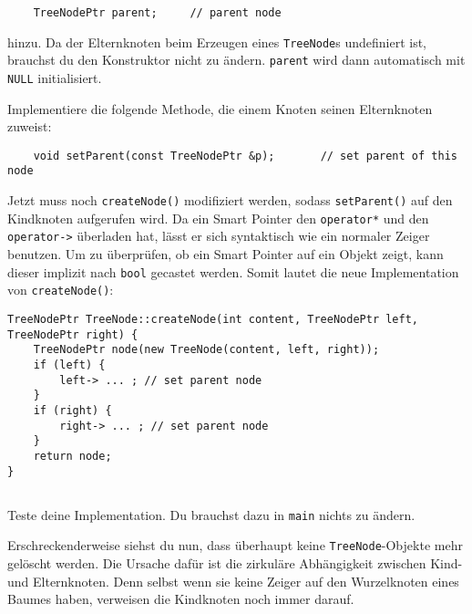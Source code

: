 \begin{lstlisting}
	TreeNodePtr parent;		// parent node
\end{lstlisting}

hinzu.
Da der Elternknoten beim Erzeugen eines \texttt{TreeNode}s undefiniert ist, brauchst du den Konstruktor nicht zu ändern. \texttt{parent} wird dann automatisch mit \texttt{NULL} initialisiert.

Implementiere die folgende Methode, die einem Knoten seinen Elternknoten zuweist:

\begin{lstlisting}
	void setParent(const TreeNodePtr &p);		// set parent of this node
\end{lstlisting}


Jetzt muss noch \texttt{createNode()} modifiziert werden, sodass \texttt{setParent()} auf den Kindknoten aufgerufen wird.
Da ein Smart Pointer den \texttt{operator*} und den \texttt{operator->} überladen hat, lässt er sich syntaktisch wie ein normaler Zeiger benutzen. Um zu überprüfen, ob ein Smart Pointer auf ein Objekt zeigt, kann dieser implizit nach \texttt{bool} gecastet werden. Somit lautet die neue Implementation von \texttt{createNode()}:

\begin{lstlisting}
TreeNodePtr TreeNode::createNode(int content, TreeNodePtr left, TreeNodePtr right) {
	TreeNodePtr node(new TreeNode(content, left, right));
	if (left) {
		left-> ... ; // set parent node
	}
	if (right) {
		right-> ... ; // set parent node
	}
	return node;
}
\end{lstlisting}

\subsection{}
Teste deine Implementation.
Du brauchst dazu in \texttt{main} nichts zu ändern.

Erschreckenderweise siehst du nun, dass überhaupt keine \texttt{TreeNode}-Objekte mehr gelöscht werden.
Die Ursache dafür ist die zirkuläre Abhängigkeit zwischen Kind- und Elternknoten.
Denn selbst wenn sie keine Zeiger auf den Wurzelknoten eines Baumes haben, verweisen die Kindknoten noch immer darauf.

